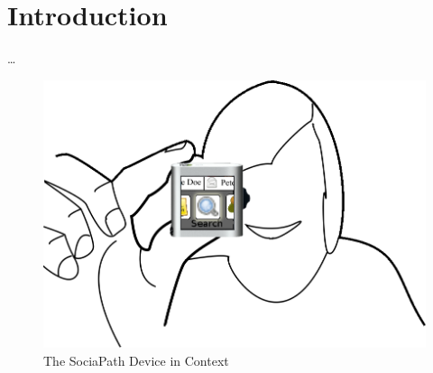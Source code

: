 %
%
%
\section{Introduction}
\ldots
\begin{figure}[h]
  \begin{center}
    \includegraphics[width=0.8\linewidth]{imgs/main.png}
  \end{center}
  \caption{The SociaPath Device in Context}
  \label{fig:main}
\end{figure}

